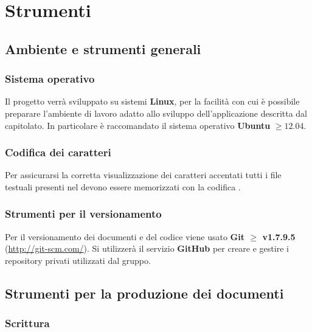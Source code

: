 \section{Strumenti}			
	\subsection{Ambiente e strumenti generali}
		
		\subsubsection{Sistema operativo}
		
		Il progetto verrà sviluppato su sistemi \textbf{Linux}, per la facilità con cui è possibile preparare l'ambiente di lavoro adatto allo sviluppo dell'applicazione descritta dal capitolato. In particolare è raccomandato il sistema operativo \textbf{Ubuntu} $\geq 12.04$.
		
		\subsubsection{Codifica dei caratteri}
		
		Per assicurarsi la corretta visualizzazione dei caratteri accentati tutti i file testuali presenti nel  devono essere memorizzati con la codifica \textbf{}.
		
		\subsubsection{Strumenti per il versionamento}
		\label{github}
		
		Per il versionamento dei documenti e del codice viene usato \textbf{Git $\ge$ v1.7.9.5} (\url{http://git-scm.com/}).
		Si utilizzerà il servizio \textbf{GitHub} per creare e gestire i repository privati utilizzati dal gruppo.
		
		
	\subsection{Strumenti per la produzione dei documenti}
	
		\subsubsection{Scrittura}
		
